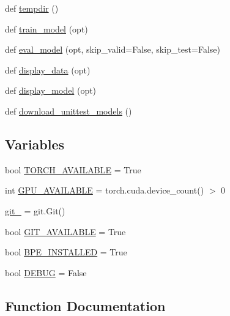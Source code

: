 \begin{DoxyCompactItemize}
\item 
def \hyperlink{namespaceparlai_1_1utils_1_1testing_a0945b769a10c0c844b29c02ff26445a5}{tempdir} ()
\item 
def \hyperlink{namespaceparlai_1_1utils_1_1testing_a005734981469efed8a992bf5edc3ca8a}{train\+\_\+model} (opt)
\item 
def \hyperlink{namespaceparlai_1_1utils_1_1testing_a6fb595d4398ee27f4d183911419a222a}{eval\+\_\+model} (opt, skip\+\_\+valid=False, skip\+\_\+test=False)
\item 
def \hyperlink{namespaceparlai_1_1utils_1_1testing_a30c532f112f9beddd873382e649b3ecd}{display\+\_\+data} (opt)
\item 
def \hyperlink{namespaceparlai_1_1utils_1_1testing_a1b41200277931b2e4e684dc9452889a9}{display\+\_\+model} (opt)
\item 
def \hyperlink{namespaceparlai_1_1utils_1_1testing_ae0c93fc8f4c3e079333dba0065fa4dd2}{download\+\_\+unittest\+\_\+models} ()
\end{DoxyCompactItemize}
\subsection*{Variables}
\begin{DoxyCompactItemize}
\item 
bool \hyperlink{namespaceparlai_1_1utils_1_1testing_a0f879f699b5616ca0bd1360324ac3d77}{T\+O\+R\+C\+H\+\_\+\+A\+V\+A\+I\+L\+A\+B\+LE} = True
\item 
int \hyperlink{namespaceparlai_1_1utils_1_1testing_acb64cdbe57c68a7d568900062681e0c5}{G\+P\+U\+\_\+\+A\+V\+A\+I\+L\+A\+B\+LE} = torch.\+cuda.\+device\+\_\+count() $>$ 0
\item 
\hyperlink{namespaceparlai_1_1utils_1_1testing_aee12f734544cd8a3dcb1c823aa51b2f0}{git\+\_\+} = git.\+Git()
\item 
bool \hyperlink{namespaceparlai_1_1utils_1_1testing_a7084c71931b4958c640b38285e89cd87}{G\+I\+T\+\_\+\+A\+V\+A\+I\+L\+A\+B\+LE} = True
\item 
bool \hyperlink{namespaceparlai_1_1utils_1_1testing_a54ab3fcb6f56b6b83d27ed5aa62148da}{B\+P\+E\+\_\+\+I\+N\+S\+T\+A\+L\+L\+ED} = True
\item 
bool \hyperlink{namespaceparlai_1_1utils_1_1testing_aca36857f73d37ca56704f812c05a3b13}{D\+E\+B\+UG} = False
\end{DoxyCompactItemize}


\subsection{Function Documentation}
\mbox{\label{namespaceparlai_1_1utils_1_1testing_ab00d4d693202afab92c06387aa50699b}} 
